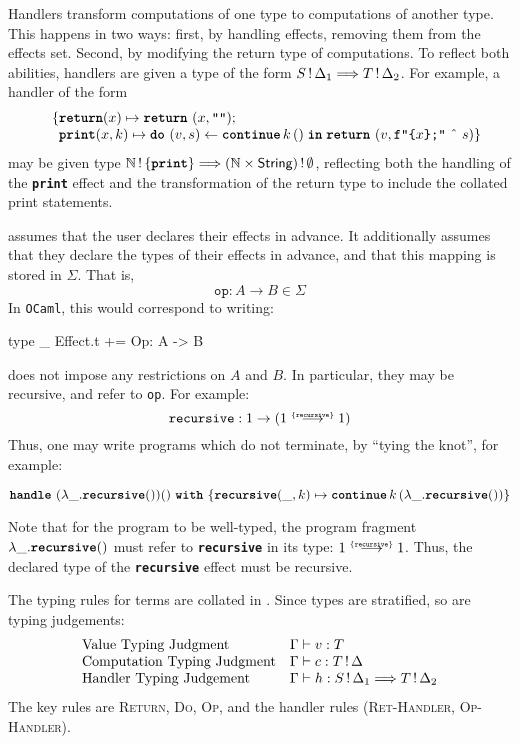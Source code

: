 Handlers transform computations of one type to computations of another type. This happens in two ways: first, by handling effects, removing them from the effects set. Second, by modifying the return type of computations. To reflect both abilities, handlers are given a type of the form $\handlerType{\effectType[\Delta_1]{S}}{\effectType[\Delta_2]{T}}$. For example, a handler of the form  
\[ \begin{array}{ll}
  \quad \{ \textbf{\texttt{return}}(x) \mapsto {\return{(x, \texttt{""})}}; \\
    \quad \, \,\, \textbf{\texttt{print}}(x, k) \mapsto {\bind{(v, s)}{\continue{k}{()}}{\return{(v, \texttt{f"\{$x$\};"} \text{ \^\ } s)}}}\}
  \end{array}
\]
may be given type $\handlerType{\effectType[\{ \textbf{\texttt{print}} \}]{\mathbb{N}}}{\effectType[\emptyset]{(\mathbb{N} \times \textsf{String})}}$, reflecting both the handling of the \textbf{\texttt{print}} effect and the transformation of the return type to include the collated print statements.

\efflang{} assumes that the user declares their effects in advance. It additionally assumes that they declare the types of their effects in advance, and that this mapping is stored in $\Sigma$. That is, 
\[\texttt{op}: A \to B \in \Sigma \]
In \texttt{OCaml}, this would correspond to writing:
\begin{ocaml}
type _ Effect.t += Op: A -> B
\end{ocaml}
\efflang{} does not impose any restrictions on $A$ and $B$. In particular, they may be recursive, and refer to \texttt{op}. For example:
\[\texttt{recursive}: 1 \to (\functionType[\{ \texttt{recursive} \}]{1}{1})\]
Thus, one may write programs which do not terminate, by ``tying the knot'', for example:
\begin{eff}
  $\handleWith{(\lambda \_ . \textbf{\texttt{recursive}} ()) ()}{\textbf{\texttt{recursive}}(\_, k) \mapsto {\continue{k}{(\lambda \_. \textbf{\texttt{recursive}} ())}}}$
\end{eff}

Note that for the program to be well-typed, the program fragment $\lambda \_. \textbf{\texttt{recursive}} ()$ must refer to \textbf{\texttt{recursive}} in its type: $\functionType[\{ \texttt{recursive} \}]{1}{1}$. Thus, the declared type of the \textbf{\texttt{recursive}} effect must be recursive. 

The typing rules for terms are collated in . Since types are stratified, so are typing judgements:
\[
\begin{array}{ll}
  \text{Value Typing Judgment} & \Gamma \vdash v: T  \\
  \text{Computation Typing Judgment} & \Gamma \vdash c: \effectType{T}  \\
  \text{Handler Typing Judgement} & \Gamma \vdash h: \handlerType{\effectType[\Delta_1]{S}}{\effectType[\Delta_2]{T}} 
\end{array}
\]
The key rules are \textsc{Return}, \textsc{Do}, \textsc{Op}, and the handler rules (\textsc{Ret-Handler}, \textsc{Op-Handler}).


